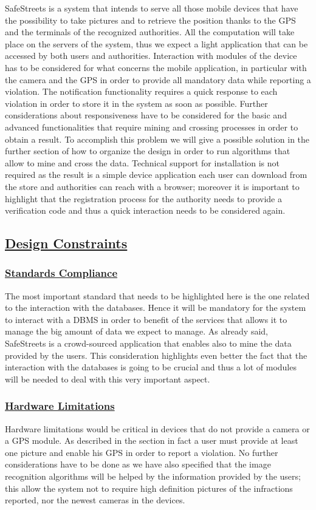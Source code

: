 		SafeStreets is a system that intends to serve all those mobile devices that have the possibility to take pictures and to retrieve the position thanks to the GPS and the terminals of the recognized authorities. All the computation will take place on the servers of the system, thus we expect a light application that can be accessed by both  users and authorities. Interaction with modules of the device has to be considered for what concerns the mobile application, in particular with the camera and the GPS in order to provide all mandatory data while reporting a violation. The notification functionality requires a quick response to each violation in order to store it in the system as soon as possible. Further considerations about responsiveness have to be considered for the basic and advanced functionalities that require mining and crossing processes in order to obtain a result. To accomplish this problem we will give a possible solution in the further section of how to organize the design in order to run algorithms that allow to mine and cross the data. Technical support for installation is not required as the result is a simple device application each user can download from the store and authorities can reach with a browser; moreover it is important to highlight that the registration process for the authority needs to provide a verification code and thus a quick interaction needs to be considered again.
	
	\subsection[Design Constraints]{\hyperlink{toc}{Design Constraints}}
		\subsubsection[Standards Compliance]{\hyperlink{toc}{Standards Compliance}}
			\label{sec:standardCompliance}
			The most important standard that needs to be highlighted here is the one related to the interaction with the databases. Hence it will be mandatory for the system to interact with a DBMS in order to benefit of the services that allows it to manage the big amount of data we expect to manage. As already said, SafeStreets is a crowd-sourced application that enables also to mine the data provided by the users. This consideration highlights even better the fact that the interaction with the databases is going to be crucial and thus a lot of modules will be needed to deal with this very important aspect.
		\subsubsection[Hardware Limitations]{\hyperlink{toc}{Hardware Limitations}}
			Hardware limitations would be critical in devices that do not provide a camera or a GPS module. As described in the section  in fact a user must provide at least one picture and enable his GPS in order to report a violation. No further considerations have to be done as we have also specified that the image recognition algorithms will be helped by the information provided by the users; this allow the system not to require high definition pictures of the infractions reported, nor the newest cameras in the devices.
